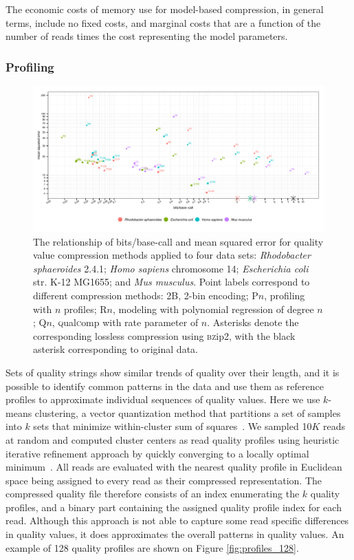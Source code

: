 \documentclass{bioinfo}
\begin{document}
\begin{methods}
The economic costs of memory use for model-based compression, in
general terms, include no fixed costs, and marginal costs that are a
function of the number of reads times the cost representing the model
parameters.

\subsubsection{Profiling}

\begin{figure}[!tb]
\centerline{\includegraphics[width=7in]{compression_results.pdf}}
\caption{The relationship of bits/base-call and mean squared error for
  quality value compression methods applied to four data sets:
  \textit{Rhodobacter sphaeroides} 2.4.1; \textit{Homo sapiens}
  chromosome 14; \textit{Escherichia coli} str. K-12 MG1655; and
  \textit{Mus musculus}. Point labels correspond to different
  compression methods: 2B, 2-bin encoding; P$n$, profiling with $n$
  profiles; R$n$, modeling with polynomial regression of degree $n$;
  Q$n$, \textsc{q}ual\textsc{c}omp with rate parameter of
  $n$. Asterisks denote the corresponding lossless compression using
  \textsc{bz}ip2, with the black asterisk corresponding to original
  data.}
\label{fig:mse_vs_bpbp}
\end{figure}

Sets of quality strings show similar trends of quality over their
length, and it is possible to identify common patterns in the data and
use them as reference profiles to approximate individual sequences of
quality values. Here we use $k$-means clustering, a vector
quantization method that partitions a set of samples into $k$ sets
that minimize within-cluster sum of
squares~\citep{macqueen1967some}. We sampled 10$K$ reads at random and
computed cluster centers as read quality profiles using heuristic
iterative refinement approach by quickly converging to a locally
optimal minimum~\citep{hartigan1979algorithm}.  All reads are
evaluated with the nearest quality profile in Euclidean space being
assigned to every read as their compressed representation.  The
compressed quality file therefore consists of an index enumerating the
$k$ quality profiles, and a binary part containing the assigned
quality profile index for each read.  Although this approach is not
able to capture some read specific differences in quality values, it
does approximates the overall patterns in quality values. An example
of 128 quality profiles are shown on Figure \ref{fig:profiles_128}.


\end{methods}
\end{document}
